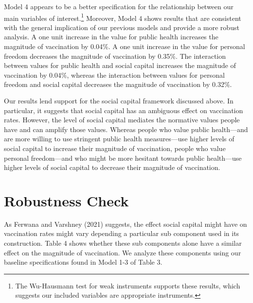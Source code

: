 \documentclass[
]{article}
\begin{document}
Model 4 appears to be a better specification for the relationship
between our main variables of interest.\footnote{The Wu-Hausmann test
  for weak instruments supports these results, which suggests our
  included variables are appropriate instruments.} Moreover, Model 4
shows results that are consistent with the general implication of our
previous models and provide a more robust analysis. A one unit increase
in the value for public health increases the magnitude of vaccination by
0.04\%. A one unit increase in the value for personal freedom decreases
the magnitude of vaccination by 0.35\%. The interaction between values
for public health and social capital increases the magnitude of
vaccination by 0.04\%, whereas the interaction between values for
personal freedom and social capital decreases the magnitude of
vaccination by 0.32\%.

Our results lend support for the social capital framework discussed
above. In particular, it suggests that social capital has an ambiguous
effect on vaccination rates. However, the level of social capital
mediates the normative values people have and can amplify those values.
Whereas people who value public health---and are more willing to use
stringent public health measures---use higher levels of social capital
to increase their magnitude of vaccination, people who value personal
freedom---and who might be more hesitant towards public health---use
higher levels of social capital to decrease their magnitude of
vaccination.

\hypertarget{robustness-check}{%
\section{Robustness Check}\label{robustness-check}}

As Ferwana and Varshney (2021) suggests, the effect social capital might
have on vaccination rates might vary depending a particular sub
component used in its construction. Table 4 shows whether these sub
components alone have a similar effect on the magnitude of vaccination.
We analyze these components using our baseline specifications found in
Model 1-3 of Table 3.
\end{document}
